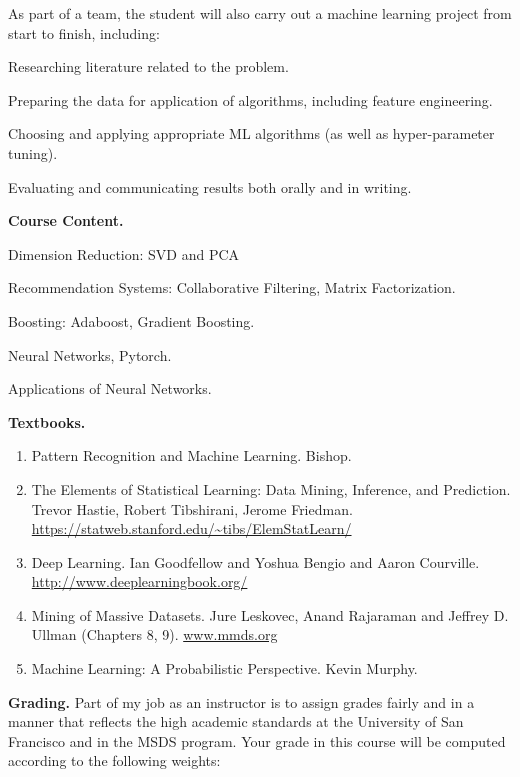 \documentclass[11pt]{article}
\newenvironment{itemize*}%
  {\begin{itemize}%
    \setlength{\itemsep}{0pt}%
    \setlength{\parskip}{0pt}}%
  {\end{itemize}}
\begin{document}
\noindent As part of a team, the student will also carry out a machine learning project from start to finish, including:
\begin{itemize*}
\item Researching literature related to the problem.
\item Preparing the data for application of algorithms, including feature engineering.
\item Choosing and applying  appropriate ML algorithms (as well as hyper-parameter tuning).
\item Evaluating and communicating results both orally and in writing.
\end{itemize*}


\noindent \textbf{Course Content.} 

\vspace{-0.05in}

\begin{itemize*}
\item Dimension Reduction: SVD and PCA
\item Recommendation Systems: Collaborative Filtering, Matrix Factorization.
\item Boosting: Adaboost, Gradient Boosting.
\item Neural Networks, Pytorch.
\item Applications of Neural Networks.
\end{itemize*}



\noindent \noindent \textbf{Textbooks.} \\
\vspace{-0.15in}
\begin{enumerate}
\item Pattern Recognition and Machine Learning. Bishop. 
\item The Elements of Statistical Learning: Data Mining, Inference, and Prediction. Trevor Hastie, Robert Tibshirani, Jerome Friedman. \url{https://statweb.stanford.edu/~tibs/ElemStatLearn/} 
\item Deep Learning. Ian Goodfellow and Yoshua Bengio and Aaron Courville.  \url{http://www.deeplearningbook.org/}
\item Mining of Massive Datasets. Jure Leskovec, Anand Rajaraman and Jeffrey D. Ullman (Chapters 8, 9). \url{www.mmds.org}
\item Machine Learning: A Probabilistic Perspective. Kevin Murphy. 
\end{enumerate}

\noindent \textbf{Grading.} Part of my job as an instructor is to assign grades fairly and in a manner that reflects the high academic standards at the University of San Francisco and in the MSDS program. Your grade in this course will be computed according to the following weights:\\
\end{document}
